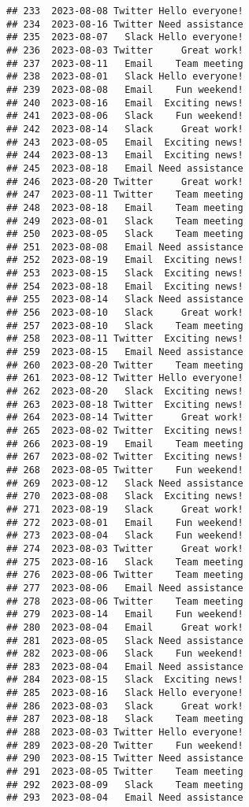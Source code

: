 \documentclass[
]{article}
\begin{document}
\begin{verbatim}
## 233  2023-08-08 Twitter Hello everyone!
## 234  2023-08-16 Twitter Need assistance
## 235  2023-08-07   Slack Hello everyone!
## 236  2023-08-03 Twitter     Great work!
## 237  2023-08-11   Email    Team meeting
## 238  2023-08-01   Slack Hello everyone!
## 239  2023-08-08   Email    Fun weekend!
## 240  2023-08-16   Email  Exciting news!
## 241  2023-08-06   Slack    Fun weekend!
## 242  2023-08-14   Slack     Great work!
## 243  2023-08-05   Email  Exciting news!
## 244  2023-08-13   Email  Exciting news!
## 245  2023-08-18   Email Need assistance
## 246  2023-08-20 Twitter     Great work!
## 247  2023-08-11 Twitter    Team meeting
## 248  2023-08-18   Email    Team meeting
## 249  2023-08-01   Slack    Team meeting
## 250  2023-08-05   Slack    Team meeting
## 251  2023-08-08   Email Need assistance
## 252  2023-08-19   Email  Exciting news!
## 253  2023-08-15   Slack  Exciting news!
## 254  2023-08-18   Email  Exciting news!
## 255  2023-08-14   Slack Need assistance
## 256  2023-08-10   Slack     Great work!
## 257  2023-08-10   Slack    Team meeting
## 258  2023-08-11 Twitter  Exciting news!
## 259  2023-08-15   Email Need assistance
## 260  2023-08-20 Twitter    Team meeting
## 261  2023-08-12 Twitter Hello everyone!
## 262  2023-08-20   Slack  Exciting news!
## 263  2023-08-18 Twitter  Exciting news!
## 264  2023-08-14 Twitter     Great work!
## 265  2023-08-02 Twitter  Exciting news!
## 266  2023-08-19   Email    Team meeting
## 267  2023-08-02 Twitter  Exciting news!
## 268  2023-08-05 Twitter    Fun weekend!
## 269  2023-08-12   Slack Need assistance
## 270  2023-08-08   Slack  Exciting news!
## 271  2023-08-19   Slack     Great work!
## 272  2023-08-01   Email    Fun weekend!
## 273  2023-08-04   Slack    Fun weekend!
## 274  2023-08-03 Twitter     Great work!
## 275  2023-08-16   Slack    Team meeting
## 276  2023-08-06 Twitter    Team meeting
## 277  2023-08-06   Email Need assistance
## 278  2023-08-06 Twitter    Team meeting
## 279  2023-08-14   Email    Fun weekend!
## 280  2023-08-04   Email     Great work!
## 281  2023-08-05   Slack Need assistance
## 282  2023-08-06   Slack    Fun weekend!
## 283  2023-08-04   Email Need assistance
## 284  2023-08-15   Slack  Exciting news!
## 285  2023-08-16   Slack Hello everyone!
## 286  2023-08-03   Slack     Great work!
## 287  2023-08-18   Slack    Team meeting
## 288  2023-08-03 Twitter Hello everyone!
## 289  2023-08-20 Twitter    Fun weekend!
## 290  2023-08-15 Twitter Need assistance
## 291  2023-08-05 Twitter    Team meeting
## 292  2023-08-09   Slack    Team meeting
## 293  2023-08-04   Email Need assistance

\end{verbatim}
\end{document}
